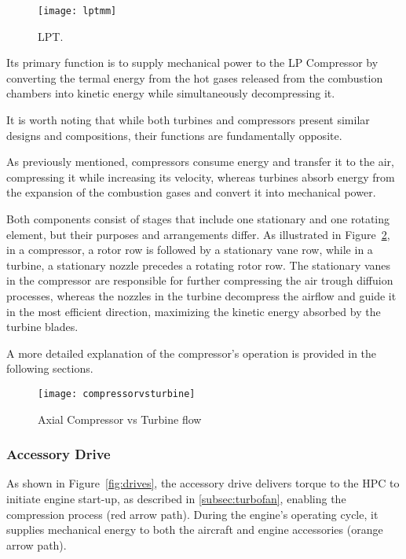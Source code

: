 \begin{figure}[H]
    \centering
    \texttt{[image: lptmm]}
    \caption{\gls{LPT}. \cite{ESM}}
    \label{fig:lpt}
\end{figure}


Its primary function is to supply mechanical power to the \gls{LP} Compressor by converting the termal energy from the hot gases released from the combustion chambers into kinetic energy while simultaneously decompressing it.

It is worth noting that while both turbines and compressors present similar designs and compositions, their functions are fundamentally opposite.

As previously mentioned, compressors consume energy and transfer it to the air, compressing it while increasing its velocity, whereas turbines absorb energy from the expansion of the combustion gases and convert it into mechanical power.

Both components consist of stages that include one stationary and one rotating element, but their purposes and arrangements differ. As illustrated in Figure~\ref{fig:compressorvsturbine}, in a compressor, a rotor row is followed by a stationary vane row, while in a turbine, a stationary nozzle precedes a rotating rotor row. The stationary vanes in the compressor are responsible for further compressing the air trough diffuion processes, whereas the nozzles in the turbine decompress the airflow and guide it in the most efficient direction, maximizing the kinetic energy absorbed by the turbine blades.

A more detailed explanation of the compressor's operation is provided in the following sections.

\begin{figure}[H]
    \centering
    \texttt{[image: compressorvsturbine]}
    \caption{Axial Compressor vs Turbine flow \cite{trent1}}
    \label{fig:compressorvsturbine}
\end{figure}

    \subsubsection{Accessory Drive}
    \label{subsubsec:accessory_drive}

As shown in Figure~\ref{fig:drives}, the accessory drive delivers torque to the HPC to initiate engine start-up, as described in \ref{subsec:turbofan}, enabling the compression process (red arrow path). During the engine’s operating cycle, it supplies mechanical energy to both the aircraft and engine accessories (orange arrow path).

